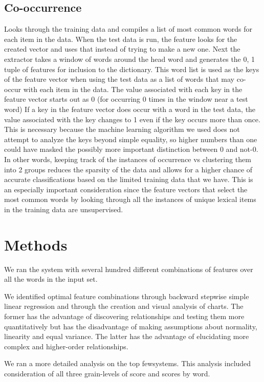 \documentclass{article}
\begin{document}
\subsection{Co-occurrence}


Looks through the training data and compiles a list of most common words for
each item in the data. When the test data is run, the feature looks for the
created vector and uses that instead of trying to make a new one. Next the
extractor takes a window of words around the head word and generates the 0, 1
tuple of features for inclusion to the dictionary. This word list is used as the
keys of the feature vector when using the test data as a list of words that may
co-occur with each item in the data. The value associated with each key in the
feature vector starts out as 0 (for occurring 0 times in the window near a test
word) If a key in the feature vector does occur with a word in the test data,
the value associated with the key changes to 1 even if the key occurs more than
once.  This is necessary because the machine learning algorithm we used does not
attempt to analyze the keys beyond simple equality, so higher numbers than one
could have masked the possibly more important distinction between 0 and not-0.
In other words, keeping track of the instances of occurrence vs clustering them
into 2 groups reduces the sparsity of the data and allows for a higher chance of
accurate classifications based on the limited training data that we have. This
is an especially important consideration since the feature vectors that select
the most common words by looking through all the instances of unique lexical
items in the training data are unsupervised.

\section{Methods}
\newcommand\few{few}

We ran the system with several hundred different combinations of features over
all the words in the input set.

We identified optimal feature combinations through backward stepwise simple
linear regression and through the creation and visual analysis of charts. The
former has the advantage of discovering relationships and testing them more
quantitatively but has the disadvantage of making assumptions about normality,
linearity and equal variance.  The latter has the advantage of elucidating more
complex and higher-order relationships.

We ran a more detailed analysis on the top \few systems.  This analysis included
consideration of all three grain-levels of score and scores by word.
\end{document}
